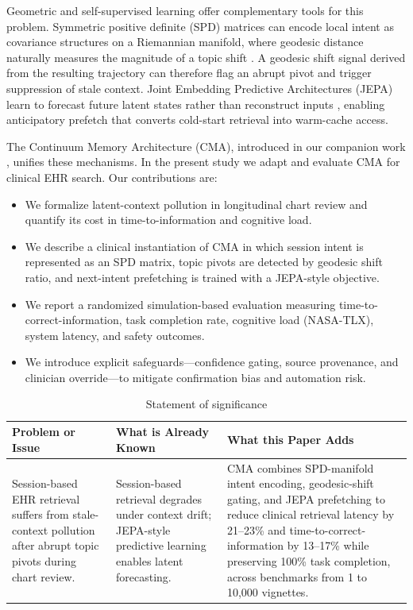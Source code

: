 \documentclass[preprint,12pt]{elsarticle}
\begin{document}
Geometric and self-supervised learning offer complementary tools for this problem. Symmetric positive definite (SPD) matrices can encode local intent as covariance structures on a Riemannian manifold, where geodesic distance naturally measures the magnitude of a topic shift \citep{bronstein2017,lopez2021,nickel2017_poincare}. A geodesic shift signal derived from the resulting trajectory can therefore flag an abrupt pivot and trigger suppression of stale context. Joint Embedding Predictive Architectures (JEPA) learn to forecast future latent states rather than reconstruct inputs \citep{lecun2022,assran2023_ijepa}, enabling anticipatory prefetch that converts cold-start retrieval into warm-cache access.

The Continuum Memory Architecture (CMA), introduced in our companion work \citep{cma2026}, unifies these mechanisms. In the present study we adapt and evaluate CMA for clinical EHR search. Our contributions are:
\begin{itemize}
  \item We formalize latent-context pollution in longitudinal chart review and quantify its cost in time-to-information and cognitive load.
  \item We describe a clinical instantiation of CMA in which session intent is represented as an SPD matrix, topic pivots are detected by geodesic shift ratio, and next-intent prefetching is trained with a JEPA-style objective.
  \item We report a randomized simulation-based evaluation measuring time-to-correct-information, task completion rate, cognitive load (NASA-TLX), system latency, and safety outcomes.
  \item We introduce explicit safeguards---confidence gating, source provenance, and clinician override---to mitigate confirmation bias and automation risk.
\end{itemize}


\begin{table}[h]
\centering
\caption{Statement of significance}
\begin{tabular}{@{}p{}p{}p{}@{}}
\toprule
\textbf{Problem or Issue} & \textbf{What is Already Known} & \textbf{What this Paper Adds} \\
\midrule
Session-based EHR retrieval suffers from stale-context pollution after abrupt topic pivots during chart review. & Session-based retrieval degrades under context drift; JEPA-style predictive learning enables latent forecasting. & CMA combines SPD-manifold intent encoding, geodesic-shift gating, and JEPA prefetching to reduce clinical retrieval latency by 21--23\% and time-to-correct-information by 13--17\% while preserving 100\% task completion, across benchmarks from 1 to 10{,}000 vignettes. \\
\bottomrule
\end{tabular}
\end{table}
\end{document}
